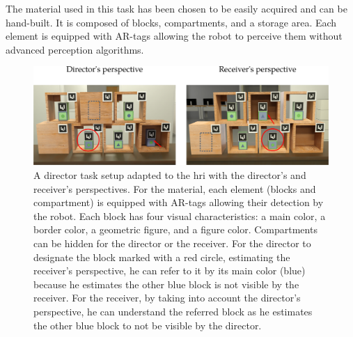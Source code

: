 \documentclass[a4paper,11pt,twoside]{StyleThese}
\begin{document}
The material used in this task has been chosen to be easily acquired and can be hand-built. It is composed of blocks, compartments, and a storage area. Each element is equipped with AR-tags allowing the robot to perceive them without advanced perception algorithms.

\begin{figure}[ht!]
	\centering
	\includegraphics[width=\textwidth]{figures/chapter4/setup.png}
	\caption{\label{chap9:fig:setup} A director task setup adapted to the \acrshort{hri} with the director's and receiver's perspectives. For the material, each element (blocks and compartment) is equipped with AR-tags allowing their detection by the robot. Each block has four visual characteristics: a main color, a border color, a geometric figure, and a figure color. Compartments can be hidden for the director or the receiver. For the director to designate the block marked with a red circle, estimating the receiver's perspective, he can refer to it by its main color (blue) because he estimates the other blue block is not visible by the receiver. For the receiver, by taking into account the director's perspective, he can understand the referred block as he estimates the other blue block to not be visible by the director.}
\end{figure}
\end{document}
